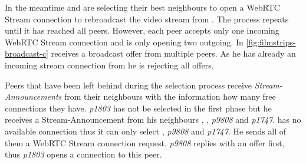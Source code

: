 In the meantime \alice and \bob are selecting their best neighbours to open a WebRTC Stream connection to rebroadcast the video stream from \claire. The process repeats until it has reached all peers. However, each peer accepts only one incoming WebRTC Stream connection and is only opening two outgoing.
In \vref{fig:filmstrips-broadcast-c} \don receives a broadcast offer from multiple peers. As he has already an incoming stream connection from \alice he is rejecting all offers.

Peers that have been left behind during the selection process receive \textit{Stream-Announcements} from their neighbours with the information how many free connections they have. \textit{p1803} has not be selected in the first phase but he receives a Stream-Announcement from his neighbours \claire, \don, \textit{p9808} and \textit{p1747}. \claire has no available connection thus it can only select \don, \textit{p9808} and \textit{p1747}. He sends all of them a WebRTC Stream connection request. \textit{p9808} replies with an offer first, thus \textit{p1803} opens a connection to this peer.
